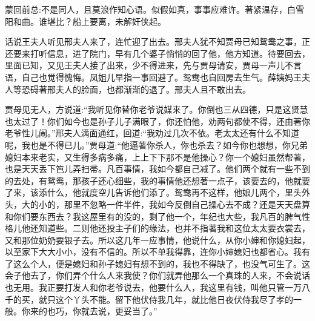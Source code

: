 

\begin{parag}
    \begin{note}蒙回前总:不是同人，且莫浪作知心语。似假如真，事事应难许。著紧温存，白雪阳和曲。谁堪比？船上要离，未解奸侠起。\end{note}
\end{parag}


\begin{parag}
    话说王夫人听见邢夫人来了，连忙迎了出去。邢夫人犹不知贾母已知鸳鸯之事，正还要来打听信息，进了院门，早有几个婆子悄悄的回了他，他方知道。待要回去，里面已知，又见王夫人接了出来，少不得进来，先与贾母请安，贾母一声儿不言语，自己也觉得愧悔。凤姐儿早指一事回避了。鸳鸯也自回房去生气。薛姨妈王夫人等恐碍著邢夫人的脸面，也都渐渐的退了。邢夫人且不敢出去。
\end{parag}


\begin{parag}
    贾母见无人，方说道:“我听见你替你老爷说媒来了。你倒也三从四德，只是这贤慧也太过了！你们如今也是孙子儿子满眼了，你还怕他，劝两句都使不得，还由著你老爷性儿闹。”邢夫人满面通红，回道:“我劝过几次不依。老太太还有什么不知道呢，我也是不得已儿。”贾母道:“他逼著你杀人，你也杀去？如今你也想想，你兄弟媳妇本来老实，又生得多病多痛，上上下下那不是他操心？你一个媳妇虽然帮著，也是天天丢下笆儿弄扫帚。凡百事情，我如今都自己减了。他们两个就有一些不到的去处，有鸳鸯，那孩子还心细些，我的事情他还想著一点子，该要去的，他就要了来，该添什么，他就度空儿告诉他们添了。鸳鸯再不这样，他娘儿两个，里头外头，大的小的，那里不忽略一件半件，我如今反倒自己操心去不成？还是天天盘算和你们要东西去？我这屋里有的没的，剩了他一个，年纪也大些，我凡百的脾气性格儿他还知道些。二则他还投主子们的缘法，也并不指著我和这位太太要衣裳去，又和那位奶奶要银子去。所以这几年一应事情，他说什么，从你小婶和你媳妇起，以至家下大大小小，没有不信的。所以不单我得靠，连你小婶媳妇也都省心。我有了这么个人，便是媳妇和孙子媳妇有想不到的，我也不得缺了，也没气可生了。这会子他去了，你们弄个什么人来我使？你们就弄他那么一个真珠的人来，不会说话也无用。我正要打发人和你老爷说去，他要什么人，我这里有钱，叫他只管一万八千的买，就只这个丫头不能。留下他伏侍我几年，就比他日夜伏侍我尽了孝的一般。你来的也巧，你就去说，更妥当了。”
\end{parag}


